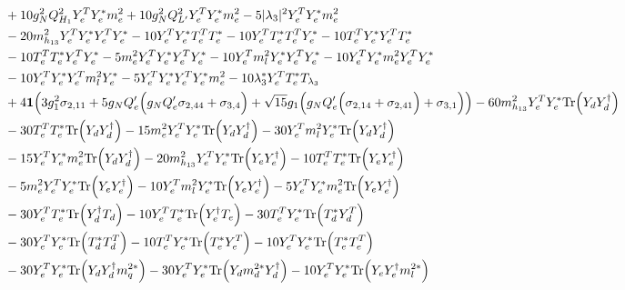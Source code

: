 {\begin{align}
 &+10 g_{N}^{2} Q_{H_1}^{2} {Y_{e}^{T}  Y_e^*  m_e^2} +10 g_{N}^{2} Q_{L'}^{2} {Y_{e}^{T}  Y_e^*  m_e^2} -5 |\lambda_3|^2 {Y_{e}^{T}  Y_e^*  m_e^2} \nonumber \\ 
 &-20 m_{h_{13}}^2 {Y_{e}^{T}  Y_e^*  Y_{e}^{T}  Y_e^*} -10 {Y_{e}^{T}  Y_e^*  T_{e}^{T}  T_e^*} -10 {Y_{e}^{T}  T_e^*  T_{e}^{T}  Y_e^*} -10 {T_{e}^{T}  Y_e^*  Y_{e}^{T}  T_e^*} \nonumber \\ 
 &-10 {T_{e}^{T}  T_e^*  Y_{e}^{T}  Y_e^*} -5 {m_e^2  Y_{e}^{T}  Y_e^*  Y_{e}^{T}  Y_e^*} -10 {Y_{e}^{T}  m_l^2  Y_e^*  Y_{e}^{T}  Y_e^*} -10 {Y_{e}^{T}  Y_e^*  m_e^2  Y_{e}^{T}  Y_e^*} \nonumber \\ 
 &-10 {Y_{e}^{T}  Y_e^*  Y_{e}^{T}  m_l^2  Y_e^*} -5 {Y_{e}^{T}  Y_e^*  Y_{e}^{T}  Y_e^*  m_e^2} -10 \lambda_3^* {Y_{e}^{T}  T_e^*} T_{\lambda_3} \nonumber \\ 
 &+4 {\bf 1} \Big(3 g_{1}^{2} \sigma_{2,11}  + 5 g_N Q_e' \Big(g_N Q_e' \sigma_{2,44}  + \sigma_{3,4}\Big) + \sqrt{15} g_1 \Big(g_N Q_e' \Big(\sigma_{2,14} + \sigma_{2,41}\Big) + \sigma_{3,1}\Big)\Big)-60 m_{h_{13}}^2 {Y_{e}^{T}  Y_e^*} \mbox{Tr}\Big({Y_d  Y_{d}^{\dagger}}\Big) \nonumber \\ 
 &-30 {T_{e}^{T}  T_e^*} \mbox{Tr}\Big({Y_d  Y_{d}^{\dagger}}\Big) -15 {m_e^2  Y_{e}^{T}  Y_e^*} \mbox{Tr}\Big({Y_d  Y_{d}^{\dagger}}\Big) -30 {Y_{e}^{T}  m_l^2  Y_e^*} \mbox{Tr}\Big({Y_d  Y_{d}^{\dagger}}\Big) \nonumber \\ 
 &-15 {Y_{e}^{T}  Y_e^*  m_e^2} \mbox{Tr}\Big({Y_d  Y_{d}^{\dagger}}\Big) -20 m_{h_{13}}^2 {Y_{e}^{T}  Y_e^*} \mbox{Tr}\Big({Y_e  Y_{e}^{\dagger}}\Big) -10 {T_{e}^{T}  T_e^*} \mbox{Tr}\Big({Y_e  Y_{e}^{\dagger}}\Big) \nonumber \\ 
 &-5 {m_e^2  Y_{e}^{T}  Y_e^*} \mbox{Tr}\Big({Y_e  Y_{e}^{\dagger}}\Big) -10 {Y_{e}^{T}  m_l^2  Y_e^*} \mbox{Tr}\Big({Y_e  Y_{e}^{\dagger}}\Big) -5 {Y_{e}^{T}  Y_e^*  m_e^2} \mbox{Tr}\Big({Y_e  Y_{e}^{\dagger}}\Big) \nonumber \\ 
 &-30 {Y_{e}^{T}  T_e^*} \mbox{Tr}\Big({Y_{d}^{\dagger}  T_d}\Big) -10 {Y_{e}^{T}  T_e^*} \mbox{Tr}\Big({Y_{e}^{\dagger}  T_e}\Big) -30 {T_{e}^{T}  Y_e^*} \mbox{Tr}\Big({T_d^*  Y_{d}^{T}}\Big) \nonumber \\ 
 &-30 {Y_{e}^{T}  Y_e^*} \mbox{Tr}\Big({T_d^*  T_{d}^{T}}\Big) -10 {T_{e}^{T}  Y_e^*} \mbox{Tr}\Big({T_e^*  Y_{e}^{T}}\Big) -10 {Y_{e}^{T}  Y_e^*} \mbox{Tr}\Big({T_e^*  T_{e}^{T}}\Big) \nonumber \\ 
 &-30 {Y_{e}^{T}  Y_e^*} \mbox{Tr}\Big({Y_d  Y_{d}^{\dagger}  m_q^{2 *}}\Big) -30 {Y_{e}^{T}  Y_e^*} \mbox{Tr}\Big({Y_d  m_d^{2 *}  Y_{d}^{\dagger}}\Big) -10 {Y_{e}^{T}  Y_e^*} \mbox{Tr}\Big({Y_e  Y_{e}^{\dagger}  m_l^{2 *}}\Big) \nonumber \\ 

\end{align}}
